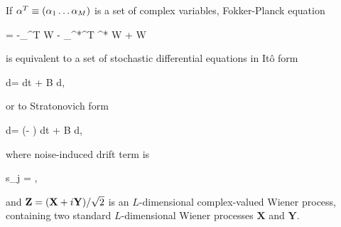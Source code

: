 \begin{theorem}
\label{thm:fpe-sde:corr:fpe-sde-complex}
	If $\mathbf{\alpha}^T \equiv (\alpha_1 \ldots \alpha_M)$ is a set of complex variables,
	Fokker-Planck equation
	\begin{eqn*}
		= -\bpartial_{\balpha}^T \avec W - \bpartial_{\balpha^*}^T \avec^* W
		+  W
	\end{eqn*}
	is equivalent to a set of stochastic differential equations in It\^{o} form
	\begin{eqn*}
		d\balpha = \avec dt + B d\Zvec,
	\end{eqn*}
	or to Stratonovich form
	\begin{eqn*}
		d\balpha = (\avec - \svec) dt + B d\Zvec,
	\end{eqn*}
	where noise-induced drift term is
	\begin{eqn*}
		s_j =  \Trace{ B^H \bpartial_{\balpha^*} \evec_j^T B },
	\end{eqn*}
	and $\mathbf{Z} = (\mathbf{X} + i\mathbf{Y}) / \sqrt{2}$ is an $L$-dimensional complex-valued Wiener process,
	containing two standard $L$-dimensional Wiener processes $\mathbf{X}$ and $\mathbf{Y}$.
\end{theorem}
